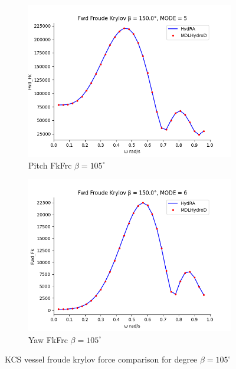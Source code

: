 \begin{figure}[H]
\begin{subfigure}[b]{0.45\textwidth}
        \includegraphics[width=\textwidth]{plots/kcs/fk/fk5.png}
        \caption{Pitch FkFrc $\beta = 105^{\circ}$}
    \end{subfigure}
    \begin{subfigure}[b]{0.45\textwidth}
        \includegraphics[width=\textwidth]{plots/kcs/fk/fk6.png}
        \caption{Yaw FkFrc $\beta = 105^{\circ}$}
    \end{subfigure}
    \caption{KCS vessel froude krylov force comparison for degree $\beta= 105^{\circ}$}
    \label{fig:kcs_froude_krylov}
\end{figure}

